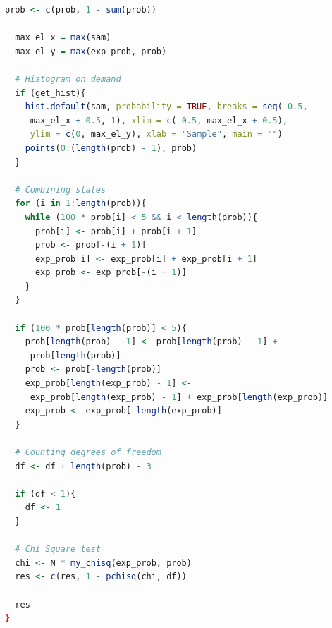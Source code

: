 \documentclass[12pt, specialist, subf, substylefile = spbu.rtx]{disser}
\begin{document}
\begin{lstlisting}[language=R]
  prob <- c(prob, 1 - sum(prob))

  max_el_x = max(sam)
  max_el_y = max(exp_prob, prob)

  # Histogram on demand
  if (get_hist){
    hist.default(sam, probability = TRUE, breaks = seq(-0.5,
     max_el_x + 0.5, 1), xlim = c(-0.5, max_el_x + 0.5),
     ylim = c(0, max_el_y), xlab = "Sample", main = "")
    points(0:(length(prob) - 1), prob)
  }

  # Combining states
  for (i in 1:length(prob)){
    while (100 * prob[i] < 5 && i < length(prob)){
      prob[i] <- prob[i] + prob[i + 1]
      prob <- prob[-(i + 1)]
      exp_prob[i] <- exp_prob[i] + exp_prob[i + 1]
      exp_prob <- exp_prob[-(i + 1)]
    }
  }
	
  if (100 * prob[length(prob)] < 5){
    prob[length(prob) - 1] <- prob[length(prob) - 1] +
     prob[length(prob)]
    prob <- prob[-length(prob)]
    exp_prob[length(exp_prob) - 1] <-
     exp_prob[length(exp_prob) - 1] + exp_prob[length(exp_prob)]
    exp_prob <- exp_prob[-length(exp_prob)]
  }
	
  # Counting degrees of freedom
  df <- df + length(prob) - 3
	
  if (df < 1){
    df <- 1
  }
	
  # Chi Square test
  chi <- N * my_chisq(exp_prob, prob)
  res <- c(res, 1 - pchisq(chi, df))
	
  res
}
	\end{lstlisting}
\end{document}
